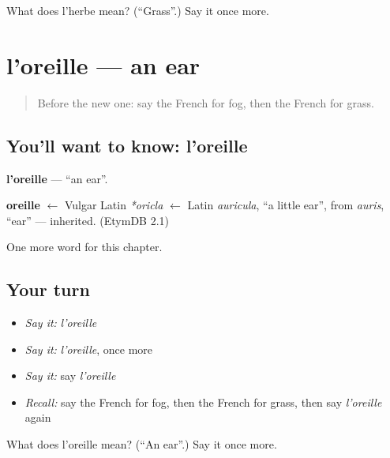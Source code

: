 \begin{tcolorbox}[breakable,colback=teal!4,colframe=teal!35!black,title={Before you move on}]
What does l'herbe mean? (\textquotedblleft{}Grass\textquotedblright{}.) Say it once more.
\end{tcolorbox}
\section[l'oreille]{l'oreille — an ear}

\label{lesson:FR-C134-oreille}



\begin{quote}
Before the new one: say the French for fog, then the French for grass.
\end{quote}

\subsection*{You'll want to know: l'oreille}
\textbf{l'oreille} — \textquotedblleft{}an ear\textquotedblright{}.

\begin{cousinweb}
\textbf{oreille} $\leftarrow$ Vulgar Latin \emph{*oricla} $\leftarrow$ Latin \emph{auricula}, \textquotedblleft{}a little ear\textquotedblright{}, from \emph{auris}, \textquotedblleft{}ear\textquotedblright{} — inherited. (EtymDB 2.1)
\end{cousinweb}

\begin{grammarlens}[title={What you've built}]
One more word for this chapter.
\end{grammarlens}

\subsection*{Your turn}
\begin{itemize}
\raggedright
  \item \emph{Say it:} \emph{l'oreille}
  \item \emph{Say it:} \emph{l'oreille}, once more
  \item \emph{Say it:} say \emph{l'oreille}
  \item \emph{Recall:} say the French for fog, then the French for grass, then say \emph{l'oreille} again
\end{itemize}

\begin{tcolorbox}[breakable,colback=teal!4,colframe=teal!35!black,title={Before you move on}]
What does l'oreille mean? (\textquotedblleft{}An ear\textquotedblright{}.) Say it once more.
\end{tcolorbox}
